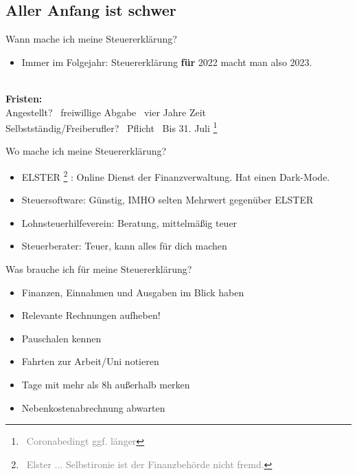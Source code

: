 \documentclass{beamer}
\newcommand{\n}{\hfill\\\vspace{0.25cm}}
\let\oldfootnote\footnote
\renewcommand{\footnote}[1]
{%
	\oldfootnote
	{
		\tiny
		\textcolor{gray}{\ #1}
	}%
}
\begin{document}
		\subsection{Aller Anfang ist schwer}
		
			\begin{frame}{Wann mache ich meine Steuererklärung?}
				\begin{itemize}
					\item Immer im Folgejahr: Steuererklärung \textbf{für} 2022 macht man also 2023.
				\end{itemize}\n
				\textbf{Fristen:}\\
				Angestellt? \textrightarrow\ freiwillige Abgabe \textrightarrow\ vier Jahre Zeit\\
				Selbstständig/Freiberufler? \textrightarrow\ Pflicht \textrightarrow\ Bis 31. Juli\footnote{Coronabedingt ggf. länger}
			\end{frame}

			\begin{frame}{Wo mache ich meine Steuererklärung?}
				\begin{itemize}
					\item ELSTER\footnote{Elster ... Selbstironie ist der Finanzbehörde nicht fremd.}: Online Dienst der Finanzverwaltung. Hat einen Dark-Mode.
					\item Steuersoftware: Günstig, IMHO selten Mehrwert gegenüber ELSTER
					\item Lohnsteuerhilfeverein: Beratung, mittelmäßig teuer
					\item Steuerberater: Teuer, kann alles für dich machen
				\end{itemize}
			\end{frame}
		
			\begin{frame}{Was brauche ich für meine Steuererklärung?}
				\begin{itemize}
					\item Finanzen, Einnahmen und Ausgaben im Blick haben
					\item Relevante Rechnungen aufheben!
					\item Pauschalen kennen
					\item Fahrten zur Arbeit/Uni notieren
					\item Tage mit mehr als 8h außerhalb merken
					\item Nebenkostenabrechnung abwarten
				\end{itemize}
			\end{frame}
		
\end{document}
